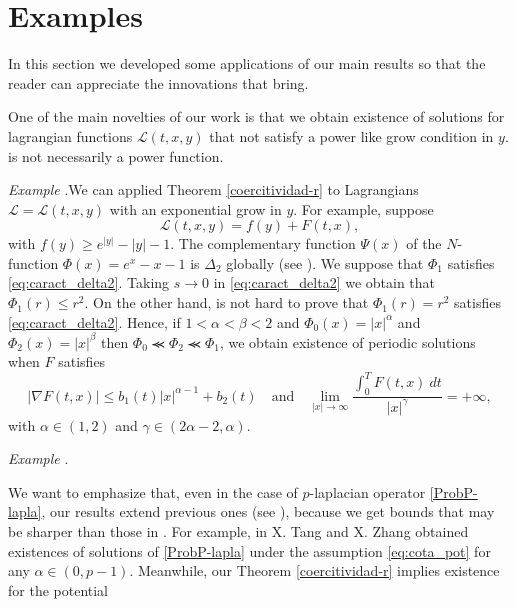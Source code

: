 \documentclass[twoside]{article}
\theoremstyle{remark}
\renewcommand{\leq}{\leqslant}
\renewcommand{\geq}{\geqslant}
\newcounter{example}
\newenvironment{example}{\noindent\textit{Example} \arabic{example}.}{\addtocounter{example}{1}}
\begin{document}
 \section{Examples}\label{sec:examples}

 In this section we developed some applications of our main results
so that the reader can appreciate the innovations that bring.


One of the main novelties of our work is that we obtain existence of solutions for lagrangian functions $\mathcal{L}(t,x,y)$ that not satisfy a power like grow condition in $y$.   is not necessarily  a power function.

\begin{example}We can applied Theorem \ref{coercitividad-r} to Lagrangians $\mathcal{L}=\mathcal{L}(t,x,y)$ with an exponential grow in $y$. For example, suppose
  \[\mathcal{L}(t,x,y)=f(y)+F(t,x),\]
with $f(y)\geq e^{|y|}-|y|-1$. The complementary
function  $\Psi(x)$ of the $N$-function $\Phi(x)=e^{x}-x-1$ is $\Delta_2$ globally (see \cite[p. 28]{KR}).  We suppose that $\Phi_1$ satisfies \eqref{eq:caract_delta2}. Taking $s\to 0$ in \eqref{eq:caract_delta2} we obtain that $\Phi_1(r)\leq r^2$. On the other hand,  is not hard to prove that $\Phi_1(r)= r^2$ satisfies  \eqref{eq:caract_delta2}. Hence, if $1<\alpha<\beta<2$ and $\Phi_0(x)=|x|^{\alpha}$ and $\Phi_2(x)=|x|^{\beta}$ then $\Phi_0 \llcurly\Phi_2\llcurly\Phi_1$,  we obtain existence of periodic solutions when $F$
satisfies
\[\left| \nabla F(t,x) \right|\leq b_1(t)|x|^{\alpha-1}+b_2(t)\quad\text{and}\quad \lim_{|x|\to\infty}\frac{\int_{0}^{T}F(t,x)\ dt}{|x|^{\gamma}}=+\infty,\]
with $\alpha\in (1,2)$ and $\gamma\in (2\alpha-2,\alpha)$.
\end{example}






\begin{example}\end{example}
We want to emphasize that, even in the case of $p$-laplacian operator \eqref{ProbP-lapla}, our results  extend  previous ones (see \cite{tang1998periodic, tang2010periodic}), because
 we get bounds that may be  sharper than those in \cite{tang1998periodic,tang2010periodic}. 
For example, in  \cite[Th. 2.1]{tang2010periodic} X. Tang and X. Zhang obtained existences of solutions of \eqref{ProbP-lapla}
under the assumption \eqref{eq:cota_pot}
 for any $\alpha\in (0,p-1)$. Meanwhile, our Theorem \ref{coercitividad-r} implies existence for the potential
\end{document}
